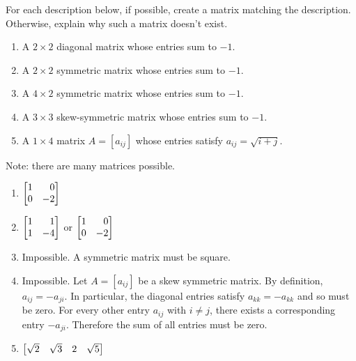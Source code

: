 \begin{exercises}
	\begin{problist}
		\prob For each description below, if possible, create a matrix 
		matching the description. Otherwise, explain why such a matrix doesn't
		exist.
		\begin{enumerate}
			\item A $2\times 2$ diagonal matrix whose entries sum to $-1$.
			\item A $2\times 2$ symmetric matrix whose entries sum to $-1$.
			\item A $4\times 2$ symmetric matrix whose entries sum to $-1$.
			\item A $3\times 3$ skew-symmetric matrix whose entries sum to $-1$.
			\item A $1\times 4$ matrix $A=[a_{ij}]$ whose entries satisfy $a_{ij}=\sqrt{i+j}$.
		\end{enumerate}
		\begin{solution}
			Note: there are many matrices possible.
			\begin{enumerate}
				\item $\mat{1&0\\0&-2}$
				\item $\mat{1&1\\1&-4}$ or $\mat{1&0\\0&-2}$
				\item Impossible. A symmetric matrix must be square.
				\item Impossible. Let $A=[a_{ij}]$ be a skew symmetric matrix. By definition, 
					$a_{ij}=-a_{ji}$. In particular, the diagonal entries satisfy $a_{kk}=-a_{kk}$
					and so must be zero. For every other entry $a_{ij}$ with $i\neq j$, there exists
					a corresponding entry $-a_{ji}$. Therefore the sum of all entries must be zero.
				\item $\mat{\sqrt{2}&\sqrt{3}&2&\sqrt{5}}$


\end{enumerate}
\end{solution}
\end{problist}
\end{exercises}
